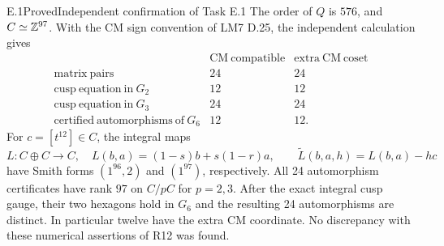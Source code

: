 \begin{statement}{E.1}{Proved}{Independent confirmation of Task E.1}
The order of $Q$ is $576$, and $C\simeq\mathbb Z^{97}$. With the CM sign
convention of LM7 D.25, the independent calculation gives
\[
\begin{array}{l|rr}
 &\mathrm{CM\ compatible}&\mathrm{extra\ CM\ coset}\\\hline
 \mathrm{matrix\ pairs}&24&24\\
 \mathrm{cusp\ equation\ in}\ G_2&12&12\\
 \mathrm{cusp\ equation\ in}\ G_3&24&24\\
 \mathrm{certified\ automorphisms\ of}\ G_6&12&12.
\end{array}
\]
For $c=[t^{12}]\in C$, the integral maps
\[
 L:C\oplus C\to C,\quad L(b,a)=(1-s)b+s(1-r)a,
 \qquad\widetilde L(b,a,h)=L(b,a)-hc
\]
have Smith forms $(1^{96},2)$ and $(1^{97})$, respectively.
All 24 automorphism certificates have rank $97$ on $C/pC$ for
$p=2,3$. After the exact integral cusp gauge, their two hexagons
hold in $G_6$ and the resulting 24 automorphisms are distinct.
In particular twelve have the extra CM coordinate. No discrepancy
with these numerical assertions of R12 was found.
\end{statement}
